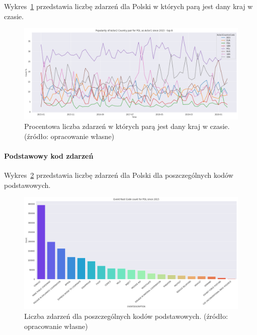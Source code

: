\documentclass[11pt]{report}
\begin{document}
    Wykres~\ref{fig:PLpairPerc} przedstawia liczbę zdarzeń dla Polski w których parą jest dany kraj w czasie.
    \begin{figure}[!htp]
        \centering
        \includegraphics[width=\linewidth]{fig/PL/PLactor2PairPercinTIME.png}
        \caption{Procentowa liczba zdarzeń w których parą jest dany kraj w czasie. (źródło: opracowanie własne)}
        \label{fig:PLpairPerc}
    \end{figure}

    \paragraph{Podstawowy kod zdarzeń}

    Wykres~\ref{fig:PLPERC} przedstawia liczbę zdarzeń dla Polski dla poszczególnych kodów podstawowych.


    \begin{figure}[!htp]
        \centering
        \includegraphics[width=\linewidth]{fig/PL/PLERC.png}
        \caption{Liczba zdarzeń dla poszczególnych kodów podstawowych. (źródło: opracowanie własne)}
        \label{fig:PLPERC}
    \end{figure}
\end{document}
